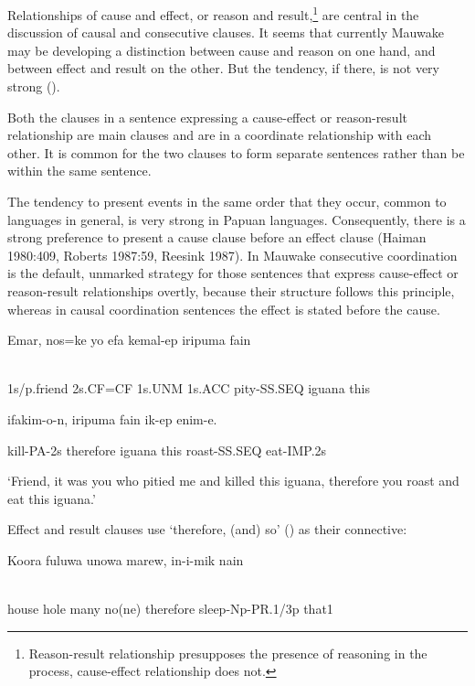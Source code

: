 Relationships of cause and effect, or reason and result,\footnote{Reason-result relationship presupposes the presence of reasoning in the process, cause-effect relationship does not.}  are central in the discussion of causal and consecutive clauses. It seems that currently Mauwake may be developing a distinction between cause and reason on one hand, and between effect and result on the other. But the tendency, if there, is not very strong (). 

Both the clauses in a sentence expressing a cause-effect or reason-result relationship are main clauses and are in a coordinate relationship with each other. It is common for the two clauses to form separate sentences rather than be within the same sentence. 

The tendency to present events in the same order that they occur, common to languages in general, is very strong in Papuan languages. Consequently, there is a strong preference to present a cause clause before an effect clause (Haiman 1980:409, Roberts 1987:59, Reesink 1987). In Mauwake consecutive coordination is the default, unmarked strategy for those sentences that express cause-effect or reason-result relationships overtly, because their structure follows this principle, whereas in causal coordination sentences the effect is stated before the cause. 

\ea%
\label{ex:x1400}
\gll Emar,  nos=ke  yo  efa  kemal-ep  iripuma  fain \\
      \\
\glt
\z

1s/p.friend  2s.CF=CF  1s.UNM  1s.ACC  pity-SS.SEQ  iguana  this

ifakim-o-n,    iripuma  fain  ik-ep  enim-e.

kill-PA-2s  therefore  iguana  this  roast-SS.SEQ  eat-IMP.2s

`Friend, it was you who pitied me and killed this iguana, therefore you roast and eat this iguana.' 

Effect and result clauses use  `therefore, (and) so' () as their connective:

\ea%
\label{ex:x1401}
\gll Koora  fuluwa  unowa  marew,    in-i-mik  nain \\
      \\
\glt
\z

house  hole  many  no(ne)  therefore  sleep-Np-PR.1/3p  that1

